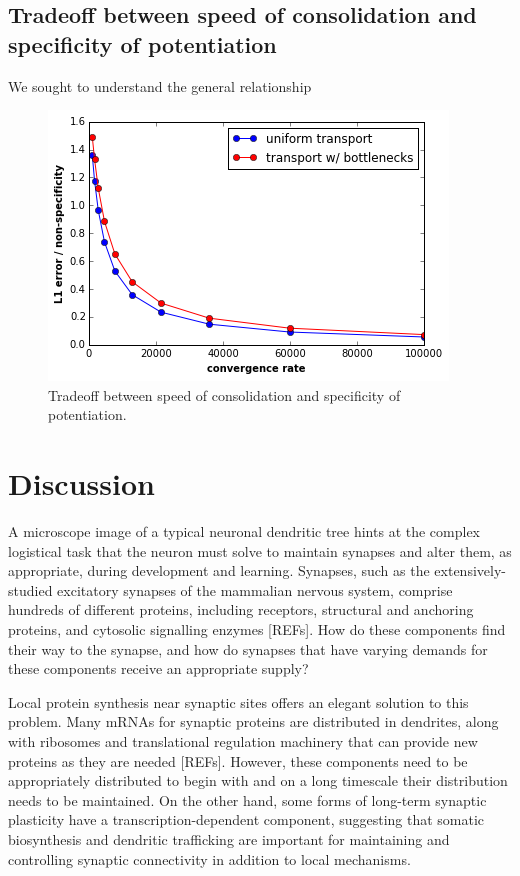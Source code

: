 \documentclass[fleqn,10pt]{wlpeerj}
\begin{document}
\subsection*{Tradeoff between speed of consolidation and specificity of potentiation}

We sought to understand the general relationship

\begin{figure}[h!]
\begin{center}
\includegraphics[width=0.5\columnwidth]{tradeoff.png}
\caption{Tradeoff between speed of consolidation and specificity of potentiation.
}
\end{center}
\end{figure}

\section*{Discussion}

A microscope image of a typical neuronal dendritic tree hints at the complex logistical task that the neuron must solve to maintain synapses and alter them, as appropriate, during development and learning. Synapses, such as the extensively-studied excitatory synapses of the mammalian nervous system, comprise hundreds of different proteins, including receptors, structural and anchoring proteins, and cytosolic signalling enzymes [REFs]. How do these components find their way to the synapse, and how do synapses that have varying demands for these components receive an appropriate supply?

Local protein synthesis near synaptic sites offers an elegant solution to this problem. Many mRNAs for synaptic proteins are distributed in dendrites, along with ribosomes and translational regulation machinery that can provide new proteins as they are needed [REFs]. However, these components need to be appropriately distributed to begin with and on a long timescale their distribution needs to be maintained. On the other hand, some forms of long-term synaptic plasticity have a transcription-dependent component, suggesting that somatic biosynthesis and dendritic trafficking are important for maintaining and controlling synaptic connectivity in addition to local mechanisms.
\end{document}
